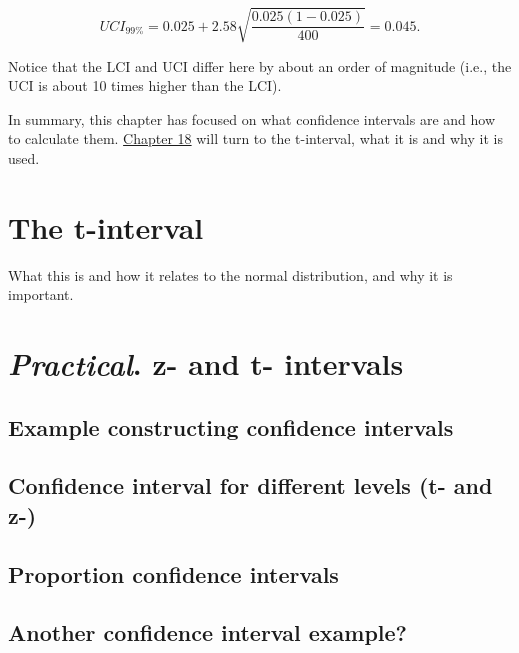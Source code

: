 \documentclass[
]{scrbook}
\begin{document}
\[UCI_{99\%} = 0.025 + 2.58 \sqrt{\frac{0.025\left(1 - 0.025\right)}{400}} = 0.045.\]

Notice that the LCI and UCI differ here by about an order of magnitude (i.e., the UCI is about 10 times higher than the LCI).

In summary, this chapter has focused on what confidence intervals are and how to calculate them.
\protect\hyperlink{Chapter_18}{Chapter 18} will turn to the t-interval, what it is and why it is used.

\hypertarget{the-t-interval}{%
\chapter{The t-interval}\label{the-t-interval}}

What this is and how it relates to the normal distribution, and why it is important.

\hypertarget{practical.-z--and-t--intervals}{%
\chapter{\texorpdfstring{\emph{Practical}. z- and t- intervals}{Practical. z- and t- intervals}}\label{practical.-z--and-t--intervals}}

\hypertarget{example-constructing-confidence-intervals}{%
\section{Example constructing confidence intervals}\label{example-constructing-confidence-intervals}}

\hypertarget{confidence-interval-for-different-levels-t--and-z-}{%
\section{Confidence interval for different levels (t- and z-)}\label{confidence-interval-for-different-levels-t--and-z-}}

\hypertarget{proportion-confidence-intervals}{%
\section{Proportion confidence intervals}\label{proportion-confidence-intervals}}

\hypertarget{another-confidence-interval-example}{%
\section{Another confidence interval example?}\label{another-confidence-interval-example}}
\end{document}
